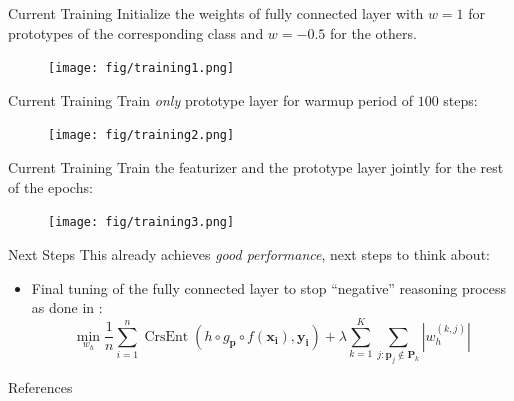 \documentclass[10pt,usepdftitle=false,aspectratio=169]{beamer}
\begin{document}
\begin{frame}{Current Training}
    Initialize the weights of fully connected layer with $w=1$ for prototypes of the corresponding class and $w=-0.5$ for the others.
    \begin{figure}
    \centering
    \texttt{[image: fig/training1.png]}
    \label{fig:my_label}
\end{figure}
\end{frame}

\begin{frame}{Current Training}
    Train \emph{only} prototype layer for warmup period of $100$ steps:
    \begin{figure}
    \centering
    \texttt{[image: fig/training2.png]}
    \label{fig:my_label}
\end{figure}
\end{frame}

\begin{frame}{Current Training}
    Train the featurizer and the prototype layer jointly for the rest of the epochs:
    \begin{figure}
    \centering
    \texttt{[image: fig/training3.png]}
    \label{fig:my_label}
\end{figure}
\end{frame}

\begin{frame}{Next Steps}
This already achieves \emph{good performance}, next steps to think about:
\vspace{0.3cm}
\begin{itemize}
    \item Final tuning of the fully connected layer to stop ``negative'' reasoning process as done in \cite{ChenLTBRS19}:
    \begin{equation}
\min _{w_{h}} \frac{1}{n} \sum_{i=1}^{n} \operatorname{CrsEnt}\left(h \circ g_{\mathbf{p}} \circ f\left(\mathbf{x}_{\mathbf{i}}\right), \mathbf{y}_{\mathbf{i}}\right)+\lambda \sum_{k=1}^{K} \sum_{j: \mathbf{p}_{j} \notin \mathbf{P}_{k}}\left|w_{h}^{(k, j)}\right|
\end{equation}
\end{itemize}
    
\end{frame}

\begin{frame}[allowframebreaks]{References}
    
    
\end{frame}
\end{document}
